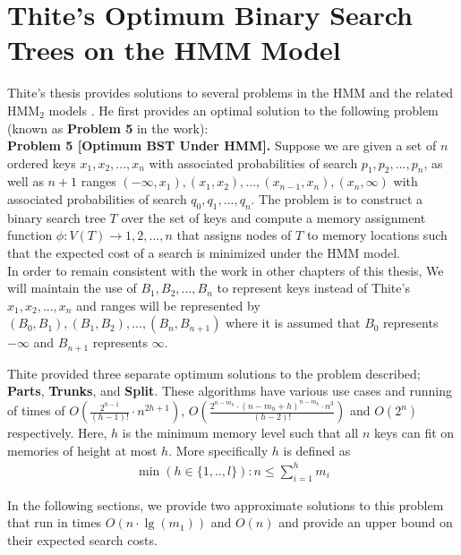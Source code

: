 \documentclass[letterpaper,12pt,titlepage,oneside,final]{book}
\theoremstyle{plain}
\begin{document}
\section{Thite's Optimum Binary Search Trees on the HMM Model}

Thite's thesis provides solutions to several problems in the HMM and the related HMM$_2$ models \cite{thite2008optimum}. He first provides an optimal solution to the following problem (known as \textbf{Problem 5} in the work):\\


\noindent \textbf{Problem 5 [Optimum BST Under HMM].}  \cite{thite2008optimum} Suppose we are given a set of $n$ ordered keys $x_1, x_2, ..., x_n$ with associated probabilities of search $p_1, p_2, ..., p_n$, as well as $n+1$ ranges $(- \infty, x_1), (x_1, x_2), ..., (x_{n-1}, x_n), (x_n, \infty)$ with associated probabilities of search $q_0, q_1, ..., q_n$. The problem is to construct a binary search tree $T$ over the set of keys and compute a memory assignment function $\phi : V (T) \rightarrow {1, 2, ..., n}$ that assigns nodes of $T$ to memory locations such that the expected cost of a search is minimized under the HMM model. \\

In order to remain consistent with the work in other chapters of this thesis, We will maintain the use of $B_1, B_2, ..., B_n$ to represent keys instead of Thite's $x_1, x_2, ..., x_n$ and ranges will be represented by $(B_0, B_1), (B_1, B_2), ..., (B_n, B_{n+1})$ where it is assumed that $B_0$ represents $- \infty$ and $B_{n+1}$ represents $\infty$.

Thite provided three separate optimum solutions to the problem described; \textbf{Parts}, \textbf{Trunks}, and \textbf{Split}. These algorithms have various use cases and running of times of $O(\frac{2^{h-1}}{(h-1)!}\cdot n^{2h+1})$, $O(\frac{2^{n-m_h}\cdot (n-m_h+h)^{n-m_h}\cdot n^3}{(h-2)!})$ and $O(2^n)$ respectively. Here, $h$ is the minimum memory level such that all $n$ keys can fit on memories of height at most $h$. More specifically $h$ is defined as \\
\begin{align*}
\min(h \in \{1,..,l\} ): n \leq \sum_{i = 1}^{h}m_i
\end{align*}


 In the following sections, we provide two approximate solutions to this problem that run in times $O(n \cdot \lg(m_1))$ and $O(n)$ and provide an upper bound on their expected search costs.  \\
\end{document}
